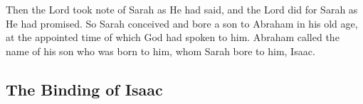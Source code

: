 \vspace{2\baselineskip}

\begin{scripture}[Genesis 21:1-3]
    Then the Lord took note of Sarah 
    as He had said, and the Lord did for Sarah as He had promised.
    So Sarah conceived and bore a son to Abraham in his old age, at the appointed time of which God had spoken to him.
    Abraham called the name of his son who was born to him, whom Sarah bore to him, Isaac.
\end{scripture}

\pagebreak

\subsection{The Binding of Isaac}
